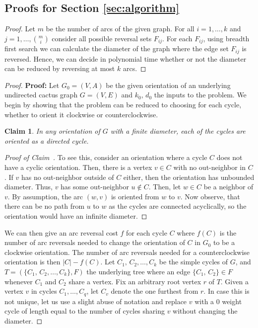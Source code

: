 \documentclass[11pt, twoside]{article}
\numberwithin{equation}{section}
\numberwithin{table}{section}
\numberwithin{figure}{section}
\newtheorem{Claim}[theorem]{Claim}
\theoremstyle{definition}
\theoremstyle{definition}
\theoremstyle{definition}
\newenvironment{claimproof}{%
  \begin{proof}[Proof of Claim~\theClaim]%
  \renewcommand{\qedsymbol}{$\lhd$}%
}{%
	\end{proof}%
}
\begin{document}
\begin{appendices}
\section{Proofs for Section \ref{sec:algorithm}}

\thmBruteForce*
\begin{proof}
    Let $m$ be the number of arcs of the given graph.
    For all $i=1, \dots, k$ and $j=1, \dots, \binom{m}{i}$ consider all possible reversal sets $F_{ij}$. For each $F_{ij}$, using breadth first search we can calculate the diameter of the graph where the edge set $F_{ij}$ is reversed. Hence, we can decide in polynomial time whether or not the diameter can be reduced by reversing at most $k$ arcs. 
\end{proof}


\thmCactusDynamicAlg*

\begin{proof}
    \noindent\textbf{Proof:} Let $ G_0=(V,A)$ be the given orientation of an underlying undirected cactus graph $G=(V,E)$
 and $k_0, \, d_0$ the inputs to the problem. We begin by showing that the problem can be reduced to choosing for each cycle, whether to orient it clockwise or counterclockwise.
    \begin{Claim}
        In any orientation of $G$ with a finite diameter, each of the cycles are oriented as a directed cycle.
    \end{Claim} 
\begin{claimproof}
    To see this, consider an orientation where a cycle $C$ does not have a cyclic orientation. Then, there is a vertex $v\in C$ with no out-neighbor in $C$. If $v$ has no out-neighbor outside of $C$ either, then the orientation has unbounded diameter. Thus, $v$ has some out-neighbor $u\notin C$. Then, let $w \in C$ be a neighbor of $v$. By assumption, the arc $(w,v)$ is oriented from $w$ to $v$. Now observe, that there can be no path from $u$ to $w$ as the cycles are connected acyclically, so the orientation would have an infinite diameter.
\end{claimproof}
 We can then give an arc reversal cost $f$ for each cycle $C$ where $f(C)$ is the number of arc reversals needed to change the orientation of $C$ in $G_0$ to be a clockwise orientation. The number of arc reversals needed for a counterclockwise orientation is then $|C|-f(C)$.
 Let $ C_1, \, C_2,\ldots, C_k $ be the simple cycles of $ G $, and $ T=(\{C_1, \, C_2,\ldots, C_k\}, F) $ 
 the underlying tree where an edge $ \{C_1, \, C_2\}\in F $ whenever $ C_1 $ and $ C_2 $ share a vertex. Fix an arbitrary root vertex $ r $ of $ T $. Given a vertex $ v $ in cycles $ C_1,\ldots, C_q $, let $ C_v $ denote the one furthest from $ r $. 
 In case this is not unique, let us use a slight abuse of notation
and replace $ v $ with a 0 weight cycle of length equal to the number of cycles sharing $v$ without changing the diameter.
	

\end{proof}
\end{appendices}
\end{document}
